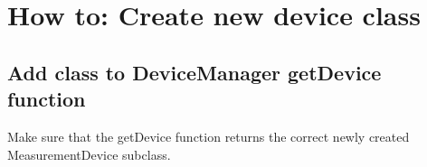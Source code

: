 \newpage
\section{How to: Create new device class}
\subsection{Add class to DeviceManager getDevice function}
Make sure that the getDevice function returns the correct newly created MeasurementDevice subclass.

\newpage\textit{}